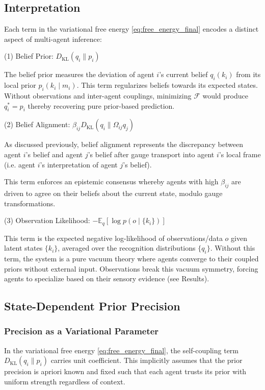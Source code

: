 \documentclass[twoside,11pt]{article}
\begin{document}
\subsection{Interpretation}

Each term in the variational free energy \eqref{eq:free_energy_final} encodes a distinct aspect of multi-agent inference:

(1) Belief Prior: $D_{\mathrm{KL}}(q_i \| p_i)$

The belief prior measures the deviation of agent $i$'s current belief $q_i(k_i)$ from its local prior $p_i(k_i \mid m_i)$. This term regularizes beliefs towards its expected states. Without observations and inter-agent couplings, minimizing $\mathcal{F}$ would produce $q_i^* = p_i$ thereby recovering pure prior-based prediction.

(2) Belief Alignment: $\beta_{ij} D_{\mathrm{KL}}(q_i \| \Omega_{ij} q_j)$

As discussed previously, belief alignment represents the discrepancy between agent $i$'s belief and agent $j$'s belief after gauge transport into agent $i$'s local frame (i.e. agent $i$'s interpretation of agent $j$'s belief).

This term enforces an epistemic consensus whereby agents with high $\beta_{ij}$ are driven to agree on their beliefs about the current state, modulo gauge transformations. 

(3) Observation Likelihood: $-\mathbb{E}_q[\log p(o \mid \{k_i\})]$

This term is the expected negative log-likelihood of observations/data $o$ given latent states $\{k_i\}$, averaged over the recognition distributions $\{q_i\}$. Without this term, the system is a pure vacuum theory where agents converge to their coupled priors without external input. Observations break this vacuum symmetry, forcing agents to specialize based on their sensory evidence (see Results).

\subsection{State-Dependent Prior Precision}
\label{sec:state_dependent_precision}

\subsubsection{Precision as a Variational Parameter}

In the variational free energy \eqref{eq:free_energy_final}, the self-coupling term $D_{\mathrm{KL}}(q_i \| p_i)$ carries unit coefficient. This implicitly assumes that the prior precision is apriori known and fixed such that each agent trusts its prior with uniform strength regardless of context. 
\end{document}
